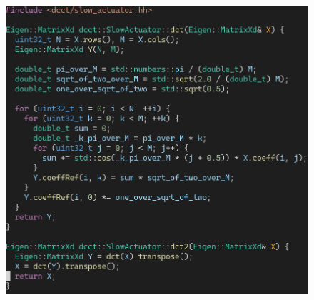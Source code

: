 \documentclass[dvipsnames, 10pt]{beamer}
\begin{document}
\begin{frame}[fragile]
\begin{columns}
\begin{column}{0.5\textwidth}
\begin{figure}
\begin{center}
          \includegraphics[width=1.0\textwidth]{figures/solution/code-cpp.png}
        \end{center}
      \end{figure}
    \end{column}
  \end{columns}
\end{frame}
\end{document}
